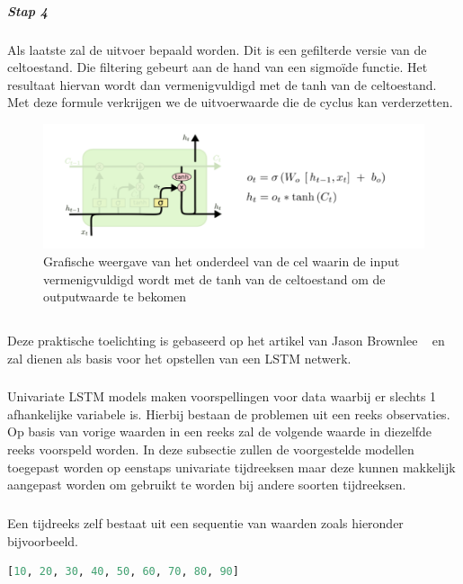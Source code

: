 \subparagraph{Stap 4}
Als laatste zal de uitvoer bepaald worden. Dit is een gefilterde versie van de celtoestand. Die filtering gebeurt aan de hand van een sigmo\"{i}de functie. Het resultaat hiervan wordt dan vermenigvuldigd met de tanh van de celtoestand. Met deze formule verkrijgen we de uitvoerwaarde die de cyclus kan verderzetten.  

\begin{figure}
    \centering
    \caption{Grafische weergave van het onderdeel van de cel waarin de input vermenigvuldigd wordt met de tanh van de celtoestand om de outputwaarde te bekomen~\autocite{Olah2015}}
    \label{fig:lstmfig6}
    \includegraphics[width=0.7\linewidth]{lstmFig6}
\end{figure}

\subsection{}
\label{subsec: Praktische toelichting van long short term memory netwerken (LSTM)}

Deze praktische toelichting is gebaseerd op het artikel van Jason Brownlee ~\autocite{Brownlee2018b} en zal dienen als basis voor het opstellen van een LSTM netwerk.

\subsubsection{}

Univariate LSTM models maken voorspellingen voor data waarbij er slechts 1 afhankelijke variabele is.
Hierbij bestaan de problemen uit een reeks observaties. Op basis van vorige waarden in een reeks zal de volgende waarde in diezelfde reeks voorspeld worden. In deze subsectie zullen de voorgestelde modellen toegepast worden op eenstaps univariate tijdreeksen maar deze kunnen makkelijk aangepast worden om gebruikt te worden bij andere soorten tijdreeksen.

\subparagraph{}
Een tijdreeks zelf bestaat uit een sequentie van waarden zoals hieronder bijvoorbeeld.
\begin{lstlisting}[language=Python]
[10, 20, 30, 40, 50, 60, 70, 80, 90]
\end{lstlisting}

